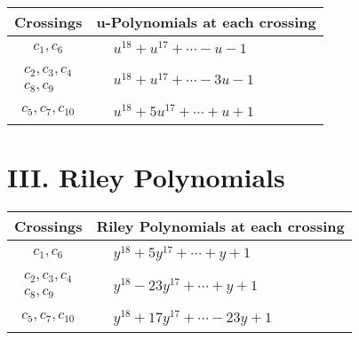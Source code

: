 \documentclass[1p]{elsarticle_modified}
\theoremstyle{definition}
\begin{document}
\begin{tabular}{m{50pt}|m{274pt}}
Crossings & \hspace{64pt}u-Polynomials at each crossing \\
\hline $$\begin{aligned}c_{1},c_{6}\end{aligned}$$&$\begin{aligned}
&u^{18}+u^{17}+\cdots- u-1
\end{aligned}$\\
\hline $$\begin{aligned}c_{2},c_{3},c_{4}\\c_{8},c_{9}\end{aligned}$$&$\begin{aligned}
&u^{18}+u^{17}+\cdots-3 u-1
\end{aligned}$\\
\hline $$\begin{aligned}c_{5},c_{7},c_{10}\end{aligned}$$&$\begin{aligned}
&u^{18}+5 u^{17}+\cdots+u+1
\end{aligned}$\\
\hline
\end{tabular}\newpage\renewcommand{\arraystretch}{1}
\centering \section*{ III. Riley Polynomials}
\begin{tabular}{m{50pt}|m{274pt}}
Crossings & \hspace{64pt}Riley Polynomials at each crossing \\
\hline $$\begin{aligned}c_{1},c_{6}\end{aligned}$$&$\begin{aligned}
&y^{18}+5 y^{17}+\cdots+y+1
\end{aligned}$\\
\hline $$\begin{aligned}c_{2},c_{3},c_{4}\\c_{8},c_{9}\end{aligned}$$&$\begin{aligned}
&y^{18}-23 y^{17}+\cdots+y+1
\end{aligned}$\\
\hline $$\begin{aligned}c_{5},c_{7},c_{10}\end{aligned}$$&$\begin{aligned}
&y^{18}+17 y^{17}+\cdots-23 y+1
\end{aligned}$\\
\hline
\end{tabular}
\vskip 2pc
\end{document}
